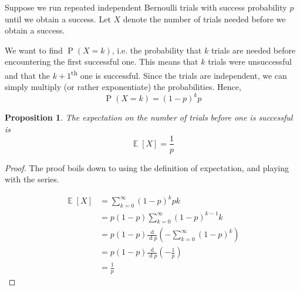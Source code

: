 \documentclass[letterpaper,11pt]{article}
\newtheorem{prop}{Proposition}
\DeclareMathOperator{\Prob}{P}
\renewcommand{\P}[1]{\Prob{\parens{#1}}}
\DeclareMathOperator{\Expect}{\mathbb{E}}
\newcommand{\E}[1]{\Expect{\left[#1\right]}}
\newcommand{\parens}[1]{\left(#1\right)}
\newcommand{\dd}[1]{\frac{\mathrm{d}}{\operatorname{d} #1}}
\begin{document}
Suppose we run repeated independent Bernoulli trials with success probability
$p$ until we obtain a success. Let $X$ denote the number of trials needed
before we obtain a success.

We want to find $\P{X = k}$, i.e. the probability that $k$ trials are needed
before encountering the first successful one. This means that $k$ trials were
unsuccessful and that the $k+1$\textsuperscript{th} one is successful. Since
the trials are independent, we can simply multiply (or rather exponentiate) the
probabilities. Hence,
\begin{equation*}
    \P{X = k} = (1-p)^k p
\end{equation*}

\begin{prop}
    The expectation on the number of trials before one is successful is
    \begin{equation*}
        \E{X} = \frac{1}{p}
    \end{equation*}
\end{prop}

\begin{proof}
    The proof boils down to using the definition of expectation, and playing
    with the series.

    \begin{align*}
        \E{X}
        &= \sum_{k=0}^\infty {
            (1 - p)^k p k
        } \\
        &= p (1-p) \sum_{k=0}^\infty {
            (1-p)^{k-1} k
        } \\
        &= p (1-p) \dd{p} \parens{
            - \sum_{k=0}^\infty {
                (1-p)^k
            }
        } \\
        &= p (1-p) \dd{p}\parens{-\frac{1}{p}} \\
        &= \frac{1}{p}
    \end{align*}
\end{proof}
\end{document}
